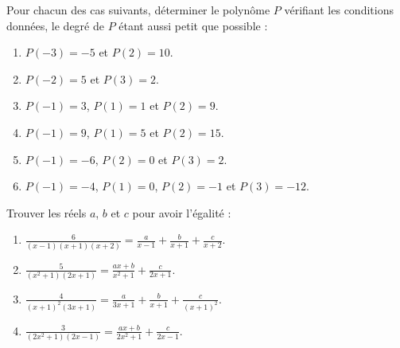            \begin{exo}\label{exo:syslin-7}
                  Pour chacun des cas suivants, d\'eterminer le polyn\^ome $P$
                  v\'erifiant les conditions donn\'ees, le degr\'e de $P$ \'etant aussi petit que possible :
                  \begin{enumerate}
                        \item $P(-3) = -5$ et $P(2) = 10$.
                        \item $P(-2) =  5$ et $P(3) =  2$.
                        \item $P(-1) =  3$, $P(1) = 1$ et $P(2) =  9$.
                        \item $P(-1) =  9$, $P(1) = 5$ et $P(2) = 15$.
                        \item $P(-1) = -6$, $P(2) = 0$ et $P(3) =  2$.
                        \item $P(-1) = -4$, $P(1) = 0$, $P(2) =  -1$ et $P(3) = -12$.
                  \end{enumerate}
            \end{exo}
            \begin{exo}\label{exo:syslin-8}
                  Trouver les r\'eels $a$, $b$ et $c$ pour avoir l'\'egalit\'e :
                  \begin{enumerate}
                        \item $\displaystyle{
                                    \frac{6}{(x-1)(x+1)(x+2)}
                                    = 
                                    \frac{a}{x-1} + \frac{b}{x+1} + \frac{c}{x+2}
                              }$.
                        \item $\displaystyle{
                                    \frac{5}{(x^2+1)(2x+1)}
                                    = 
                                    \frac{a x + b}{x^2+1} + \frac{c}{2x+1}
                              }$.
                        \item $\displaystyle{
                                    \frac{4}{(x+1)^2(3x+1)}
                                    = 
                                    \frac{a}{3x+1} + \frac{b}{x+1} + \frac{c}{(x+1)^2}
                              }$.
                        \item $\displaystyle{
                                    \frac{3}{(2 x^2+1)(2x-1)}
                                    = 
                                    \frac{a x + b}{2x^2+1} + \frac{c}{2x-1}
                              }$.
                  \end{enumerate}
            \end{exo}



